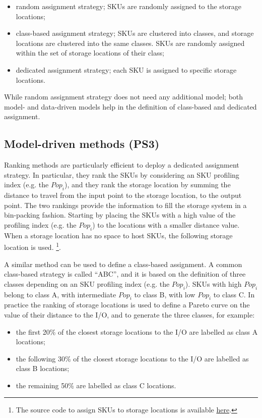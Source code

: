 \begin{itemize}
    \item random assignment strategy; SKUs are randomly assigned to the storage locations;
    \item class-based assignment strategy; SKUs are clustered into classes, and storage locations are clustered into the same classes. SKUs are randomly assigned within the set of storage locations of their class;
    \item dedicated assignment strategy; each SKU is assigned to specific storage locations.

\end{itemize}

While random assignment strategy does not need any additional model; both model- and data-driven models help in the definition of class-based and dedicated assignment.

\subsection{Model-driven methods (PS3)}
Ranking methods are particularly efficient to deploy a dedicated assignment strategy. In particular, they rank the SKUs by considering an SKU profiling index (e.g. the $Pop_i$), and they rank the storage location by summing the distance to travel from the input point to the storage location, to the output point. The two rankings provide the information to fill the storage system in a bin-packing fashion. Starting by placing the SKUs with a high value of the profiling index (e.g. the $Pop_i$) to the locations with a smaller distance value. When a storage location has no space to host SKUs, the following storage location is used. \footnote{The source code to assign SKUs to storage locations is available \href{https://github.com/aletuf93/logproj/blob/master/logproj/P2_assignmentProblem/warehousing_ABC_saving.py}{here}.}.\par

A similar method can be used to define a class-based assignment. A common class-based strategy is called “ABC”, and it is based on the definition of three classes depending on an SKU profiling index (e.g. the $Pop_i$). SKUs with high $Pop_i$ belong to class A, with intermediate $Pop_i$ to class B, with low $Pop_i$ to class C. In practice the ranking of storage locations is used to define a Pareto curve on the value of their distance to the I/O, and to generate the three classes, for example:

\begin{itemize}
    \item the first 20\% of the closest storage locations to the I/O are labelled as class A locations;
    \item the following 30\% of the closest storage locations to the I/O are labelled as class B locations;
    \item the remaining 50\% are labelled as class C locations.

\end{itemize}


